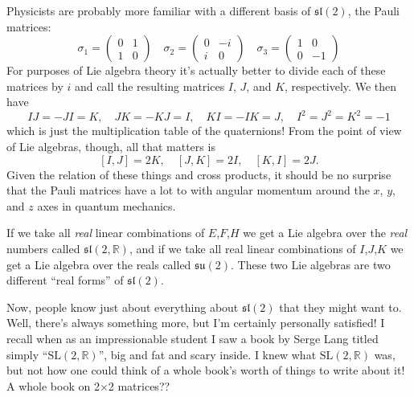 \documentclass[12pt]{article}
\begin{document}
Physicists are probably more familiar with a different basis of
\(\mathfrak{sl}(2)\), the Pauli matrices:
\[\sigma_1=\left(\begin{array}{cc}0&1\\1&0\end{array}\right) \quad \sigma_2=\left(\begin{array}{cc}0&-i\\i&0\end{array}\right) \quad \sigma_3=\left(\begin{array}{cc}1&0\\0&-1\end{array}\right)\]
For purposes of Lie algebra theory it's actually better to divide each
of these matrices by \(i\) and call the resulting matrices \(I\), \(J\),
and \(K\), respectively. We then have
\[IJ = -JI = K, \quad JK = -KJ = I, \quad KI = -IK = J, \quad I^2 = J^2 = K^2 = -1\]
which is just the multiplication table of the quaternions! From the
point of view of Lie algebras, though, all that matters is
\[[I,J] = 2K, \quad [J,K] = 2I, \quad [K,I] = 2J.\] Given the relation
of these things and cross products, it should be no surprise that the
Pauli matrices have a lot to with angular momentum around the \(x\),
\(y\), and \(z\) axes in quantum mechanics.

If we take all \emph{real} linear combinations of \(E\),\(F\),\(H\) we
get a Lie algebra over the \emph{real} numbers called
\(\mathfrak{sl}(2,\mathbb{R})\), and if we take all real linear
combinations of \(I\),\(J\),\(K\) we get a Lie algebra over the reals
called \(\mathfrak{su}(2)\). These two Lie algebras are two different
``real forms'' of \(\mathfrak{sl}(2)\).

Now, people know just about everything about \(\mathfrak{sl}(2)\) that
they might want to. Well, there's always something more, but I'm
certainly personally satisfied! I recall when as an impressionable
student I saw a book by Serge Lang titled simply
``\(\mathrm{SL}(2,\mathbb{R})\)'', big and fat and scary inside. I knew
what \(\mathrm{SL}(2,\mathbb{R})\) was, but not how one could think of a
whole book's worth of things to write about it! A whole book on 2×2
matrices??
\end{document}

